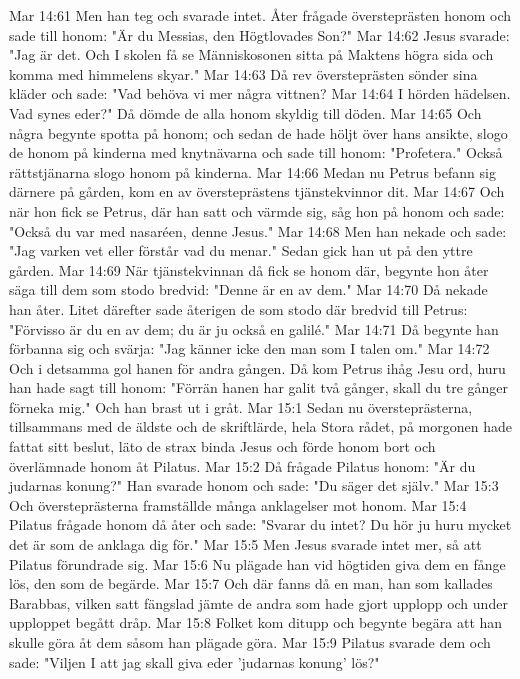 Mar 14:61  Men han teg och svarade intet. Åter frågade översteprästen honom och sade till honom: "Är du Messias, den Högtlovades Son?"
Mar 14:62  Jesus svarade: "Jag är det. Och I skolen få se Människosonen sitta på Maktens högra sida och komma med himmelens skyar."
Mar 14:63  Då rev översteprästen sönder sina kläder och sade: "Vad behöva vi mer några vittnen?
Mar 14:64  I hörden hädelsen. Vad synes eder?" Då dömde de alla honom skyldig till döden.
Mar 14:65  Och några begynte spotta på honom; och sedan de hade höljt över hans ansikte, slogo de honom på kinderna med knytnävarna och sade till honom: "Profetera." Också rättstjänarna slogo honom på kinderna.
Mar 14:66  Medan nu Petrus befann sig därnere på gården, kom en av översteprästens tjänstekvinnor dit.
Mar 14:67  Och när hon fick se Petrus, där han satt och värmde sig, såg hon på honom och sade: "Också du var med nasaréen, denne Jesus."
Mar 14:68  Men han nekade och sade: "Jag varken vet eller förstår vad du menar." Sedan gick han ut på den yttre gården.
Mar 14:69  När tjänstekvinnan då fick se honom där, begynte hon åter säga till dem som stodo bredvid: "Denne är en av dem."
Mar 14:70  Då nekade han åter. Litet därefter sade återigen de som stodo där bredvid till Petrus: "Förvisso är du en av dem; du är ju också en galilé."
Mar 14:71  Då begynte han förbanna sig och svärja: "Jag känner icke den man som I talen om."
Mar 14:72  Och i detsamma gol hanen för andra gången. Då kom Petrus ihåg Jesu ord, huru han hade sagt till honom: "Förrän hanen har galit två gånger, skall du tre gånger förneka mig." Och han brast ut i gråt.
Mar 15:1  Sedan nu översteprästerna, tillsammans med de äldste och de skriftlärde, hela Stora rådet, på morgonen hade fattat sitt beslut, läto de strax binda Jesus och förde honom bort och överlämnade honom åt Pilatus.
Mar 15:2  Då frågade Pilatus honom: "Är du judarnas konung?" Han svarade honom och sade: "Du säger det själv."
Mar 15:3  Och översteprästerna framställde många anklagelser mot honom.
Mar 15:4  Pilatus frågade honom då åter och sade: "Svarar du intet? Du hör ju huru mycket det är som de anklaga dig för."
Mar 15:5  Men Jesus svarade intet mer, så att Pilatus förundrade sig.
Mar 15:6  Nu plägade han vid högtiden giva dem en fånge lös, den som de begärde.
Mar 15:7  Och där fanns då en man, han som kallades Barabbas, vilken satt fängslad jämte de andra som hade gjort upplopp och under upploppet begått dråp.
Mar 15:8  Folket kom ditupp och begynte begära att han skulle göra åt dem såsom han plägade göra.
Mar 15:9  Pilatus svarade dem och sade: "Viljen I att jag skall giva eder 'judarnas konung' lös?"
